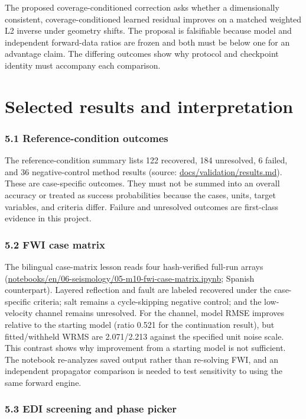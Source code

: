 The proposed coverage-conditioned correction asks whether a
dimensionally consistent, coverage-conditioned learned residual improves
on a matched weighted L2 inverse under geometry shifts. The proposal is
falsifiable because model and independent forward-data ratios are frozen
and both must be below one for an advantage claim. The differing
outcomes show why protocol and checkpoint identity must accompany each
comparison.

\section{Selected results and
interpretation}\label{selected-results-and-interpretation}

\subsubsection{5.1 Reference-condition
outcomes}\label{reference-condition-outcomes}

The reference-condition summary lists 122 recovered, 184 unresolved, 6
failed, and 36 negative-control method results (source:
\url{docs/validation/results.md}). These are case-specific outcomes.
They must not be summed into an overall accuracy or treated as success
probabilities because the cases, units, target variables, and criteria
differ. Failure and unresolved outcomes are first-class evidence in this
project.

\subsubsection{5.2 FWI case matrix}\label{fwi-case-matrix}

The bilingual case-matrix lesson reads four hash-verified full-run
arrays (\url{notebooks/en/06-seismology/05-m10-fwi-case-matrix.ipynb};
Spanish counterpart). Layered reflection and fault are labeled recovered
under the case-specific criteria; salt remains a cycle-skipping negative
control; and the low-velocity channel remains unresolved. For the
channel, model RMSE improves relative to the starting model (ratio 0.521
for the continuation result), but fitted/withheld WRMS are 2.071/2.213
against the specified unit noise scale. This contrast shows why
improvement from a starting model is not sufficient. The notebook
re-analyzes saved output rather than re-solving FWI, and an independent
propagator comparison is needed to test sensitivity to using the same
forward engine.

\subsubsection{5.3 EDI screening and phase
picker}\label{edi-screening-and-phase-picker}

